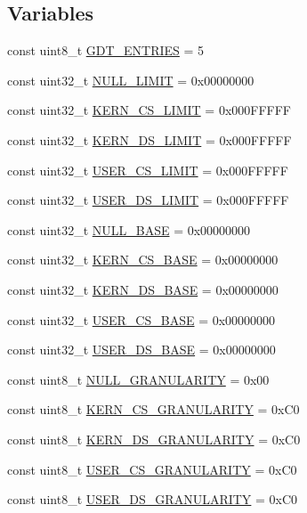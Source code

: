 \subsection*{Variables}
\begin{DoxyCompactItemize}
\item 
const uint8\+\_\+t \hyperlink{namespace_g_d_t_aab056cef2c3ca53ed66a58f7ae7edfce}{G\+D\+T\+\_\+\+E\+N\+T\+R\+I\+ES} = 5
\item 
const uint32\+\_\+t \hyperlink{namespace_g_d_t_aa1bc8e5b9e4868b6006698829d396724}{N\+U\+L\+L\+\_\+\+L\+I\+M\+IT} = 0x00000000
\item 
const uint32\+\_\+t \hyperlink{namespace_g_d_t_ab6d06fd71d054410909a4aacafca32b7}{K\+E\+R\+N\+\_\+\+C\+S\+\_\+\+L\+I\+M\+IT} = 0x000\+F\+F\+F\+FF
\item 
const uint32\+\_\+t \hyperlink{namespace_g_d_t_a0b19f62da26fef63c425face3191a75b}{K\+E\+R\+N\+\_\+\+D\+S\+\_\+\+L\+I\+M\+IT} = 0x000\+F\+F\+F\+FF
\item 
const uint32\+\_\+t \hyperlink{namespace_g_d_t_af9547432d12ed931a8aafe2f078bfdb9}{U\+S\+E\+R\+\_\+\+C\+S\+\_\+\+L\+I\+M\+IT} = 0x000\+F\+F\+F\+FF
\item 
const uint32\+\_\+t \hyperlink{namespace_g_d_t_a65f624eed850cd303b27f014e43576e4}{U\+S\+E\+R\+\_\+\+D\+S\+\_\+\+L\+I\+M\+IT} = 0x000\+F\+F\+F\+FF
\item 
const uint32\+\_\+t \hyperlink{namespace_g_d_t_a99c336ac1e41e7292c0da263389748d7}{N\+U\+L\+L\+\_\+\+B\+A\+SE} = 0x00000000
\item 
const uint32\+\_\+t \hyperlink{namespace_g_d_t_aa468dabc4b15ceac65292f59b3d98e76}{K\+E\+R\+N\+\_\+\+C\+S\+\_\+\+B\+A\+SE} = 0x00000000
\item 
const uint32\+\_\+t \hyperlink{namespace_g_d_t_a2a50b369a9ea36da4724c269a2c005a2}{K\+E\+R\+N\+\_\+\+D\+S\+\_\+\+B\+A\+SE} = 0x00000000
\item 
const uint32\+\_\+t \hyperlink{namespace_g_d_t_a17592b6bcda3da0b4162793c5ab25d34}{U\+S\+E\+R\+\_\+\+C\+S\+\_\+\+B\+A\+SE} = 0x00000000
\item 
const uint32\+\_\+t \hyperlink{namespace_g_d_t_af3b358f3263317a93fb70214db0fe9df}{U\+S\+E\+R\+\_\+\+D\+S\+\_\+\+B\+A\+SE} = 0x00000000
\item 
const uint8\+\_\+t \hyperlink{namespace_g_d_t_ac7317e2289378a4e654f8137e837e954}{N\+U\+L\+L\+\_\+\+G\+R\+A\+N\+U\+L\+A\+R\+I\+TY} = 0x00
\item 
const uint8\+\_\+t \hyperlink{namespace_g_d_t_a1ff5f5e1d41e01c0c4c32711264a5e23}{K\+E\+R\+N\+\_\+\+C\+S\+\_\+\+G\+R\+A\+N\+U\+L\+A\+R\+I\+TY} = 0x\+C0
\item 
const uint8\+\_\+t \hyperlink{namespace_g_d_t_a93b62ba7a382d7801e63bd32655a87c3}{K\+E\+R\+N\+\_\+\+D\+S\+\_\+\+G\+R\+A\+N\+U\+L\+A\+R\+I\+TY} = 0x\+C0
\item 
const uint8\+\_\+t \hyperlink{namespace_g_d_t_abca29cbf8c95b79a247c1b7af347deba}{U\+S\+E\+R\+\_\+\+C\+S\+\_\+\+G\+R\+A\+N\+U\+L\+A\+R\+I\+TY} = 0x\+C0
\item 
const uint8\+\_\+t \hyperlink{namespace_g_d_t_a1d41acb5aa3d1b3690fb1fa6e843f110}{U\+S\+E\+R\+\_\+\+D\+S\+\_\+\+G\+R\+A\+N\+U\+L\+A\+R\+I\+TY} = 0x\+C0
\end{DoxyCompactItemize}


